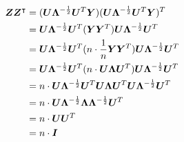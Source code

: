 \begin{align*}
\bm{Z} \bm{Z}^\intercal 
&= (\bm{U} \bm{\Lambda}^{-\frac12} \bm{U}^T \bm{Y}) (\bm{U} \bm{\Lambda}^{-\frac12} \bm{U}^T \bm{Y})^T \\
&= \bm{U} \bm{\Lambda}^{-\frac12} \bm{U}^T (\bm{Y} \bm{Y}^T ) \bm{U} \bm{\Lambda}^{-\frac12} \bm{U}^T \\
&= \bm{U} \bm{\Lambda}^{-\frac12} \bm{U}^T (n \cdot \frac1n \bm{Y} \bm{Y}^T ) \bm{U} \bm{\Lambda}^{-\frac12} \bm{U}^T \\
&= \bm{U} \bm{\Lambda}^{-\frac12} \bm{U}^T (n \cdot \bm{U} \bm{\Lambda} \bm{U}^T ) \bm{U} \bm{\Lambda}^{-\frac12} \bm{U}^T \\
&= n \cdot \bm{U} \bm{\Lambda}^{-\frac12} \bm{U}^T \bm{U} \bm{\Lambda} \bm{U}^T \bm{U} \bm{\Lambda}^{-\frac12} \bm{U}^T \\
&= n \cdot \bm{U} \bm{\Lambda}^{-\frac12} \bm{\Lambda} \bm{\Lambda}^{-\frac12} \bm{U}^T \\
&= n \cdot \bm{U} \bm{U}^T \\
&= n \cdot \bm{I}
\end{align*}

\color{black}





